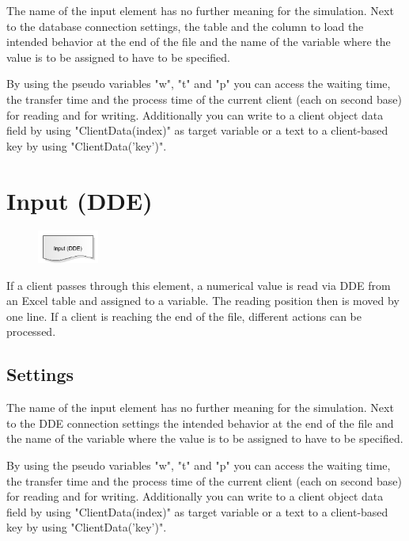 The name of the input element has no further meaning for the simulation.
Next to the database connection settings, the table and the column to load
the intended behavior at the end of the file and the name of the variable
where the value is to be assigned to have to be specified.

By using the pseudo variables "w", "t" and "p" you can access the waiting time, the transfer time and the
process time of the current client (each on second base) for reading and for writing. Additionally you can
write to a client object data field by using "ClientData(index)" as target variable or a text to a client-based
key by using "ClientData('key')".


\section{Input (DDE)}
\label{ref:ModelElementInputDDE}

\begin{figure}
\vspace{-22pt}
\includegraphics[width=2cm]{imageModelElementInputDDE.png}
\vspace{-22pt}
\end{figure}

If a client passes through this element, a numerical value is read via DDE from an
Excel table and assigned to a variable. The reading position then is moved by one line.
If a client is reaching the end of the file, different actions can be processed.

\subsection*{Settings}

The name of the input element has no further meaning for the simulation.
Next to the DDE connection settings the intended behavior at the end of the file and the name of the variable
where the value is to be assigned to have to be specified.

By using the pseudo variables "w", "t" and "p" you can access the waiting time, the transfer time and the
process time of the current client (each on second base) for reading and for writing. Additionally you can
write to a client object data field by using "ClientData(index)" as target variable or a text to a client-based
key by using "ClientData('key')".


